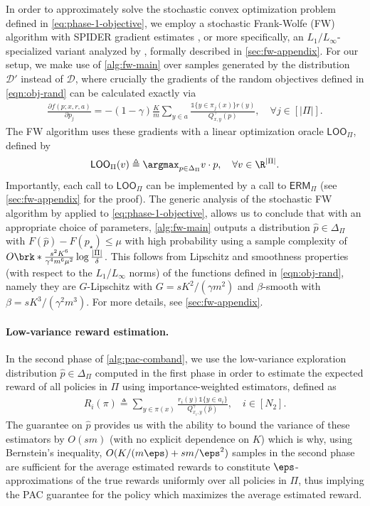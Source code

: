 \documentclass[11pt]{article}
\newcommand{\eqdef}{\triangleq}
\renewcommand{\ind}[1]{\mathds{1}\{#1\}}
\newcommand{\yprobg}[3]{Q^\gamma_{#2,#3}(#1)}
\newcommand{\loo}{\textsf{LOO}}
\newcommand{\oracle}{\textsf{ERM}}
\newcommand{\pred}{a}
\newcommand{\rew}{r}
\newcommand{\lab}{y}
\newcommand{\calD}{\mathcal{D}}
\newcommand{\iwd}{\mathcal{D}'}
\newcommand{\objrand}{f}
\theoremstyle{plain}
\begin{document}
In order to approximately solve the stochastic convex optimization problem defined in \cref{eq:phase-1-objective}, we employ a stochastic Frank-Wolfe (FW) algorithm with SPIDER gradient estimates \citep{yurtsever19b}, or more specifically, an $L_1/L_\infty$-specialized variant analyzed by \cite{erez2024fast}, formally described in \cref{sec:fw-appendix}. For our setup, we make use of \cref{alg:fw-main} over samples generated by the distribution $\iwd$ instead of $\calD$, where crucially the gradients of the random objectives defined in \cref{eqn:obj-rand} can be calculated exactly via
\begin{align}
\label{eqn:grad-obj-rand}
    \frac{\partial \objrand(p;x,\rew,\pred)}{\partial p_j} = - (1-\gamma) \frac{K}{m} \sum_{\lab \in \pred} \frac{\ind{\lab \in \pi_j(x)} \rew(\lab)}{\yprobg{p}{x}{y}}, \quad \forall j \in [|\Pi|].
\end{align}
The FW algorithm uses these gradients with a linear optimization oracle $\loo_\Pi$, defined by
\begin{align*}
    \loo_\Pi(v) \eqdef \argmax_{p \in \Delta_\Pi} v \cdot p, \quad \forall v \in \R^{|\Pi|}.
\end{align*}
Importantly, each call to $\loo_\Pi$ can be implemented by a call to $\oracle_\Pi$ (see \cref{sec:fw-appendix} for the proof). The generic analysis of the stochastic FW algorithm by \cite{erez2024fast} applied to \cref{eq:phase-1-objective}, allows us to conclude that with an appropriate choice of parameters, \cref{alg:fw-main} outputs a distribution $\hat p \in \Delta_\Pi$ with $F(\hat p) - F(p_\star) \leq \mu$ with high probability using a sample complexity of $O \brk*{\frac{s^2 K^6}{\gamma^4 m^6 \mu^2} \log \frac{|\Pi|}{\delta}}$. This follows from Lipschitz and smoothness properties (with respect to the $L_1$/$L_\infty$ norms) of the functions defined in \cref{eqn:obj-rand}, namely they are $G$-Lipschitz with $G = s K^2 / (\gamma m^2)$ and $\beta$-smooth with $\beta = s K^3 / (\gamma^2 m^3)$. For more details, see \cref{sec:fw-appendix}.

\paragraph{Low-variance reward estimation.} In the second phase of \cref{alg:pac-comband}, we use the low-variance exploration distribution $\hat p \in \Delta_\Pi$ computed in the first phase in order to estimate the expected reward of all policies in $\Pi$ using importance-weighted estimators, defined as 
\begin{align*}
    R_i(\pi) \eqdef \sum_{\lab \in \pi(x)} \frac{\rew_i(\lab) \ind{\lab \in \pred_i}}{\yprobg{\hat p}{x_i}{\lab}}, \quad i \in [N_2].
\end{align*}
The guarantee on $\hat p$ provides us with the ability to bound the variance of these estimators by $O(sm)$ (with no explicit dependence on $K$) which is why, using Bernstein's inequality, $O( K / (m \eps) + sm / \eps^2)$ samples in the second phase are sufficient for the average estimated rewards to constitute $\eps$-approximations of the true rewards uniformly over all policies in $\Pi$, thus implying the PAC guarantee for the policy which maximizes the average estimated reward.
\end{document}
